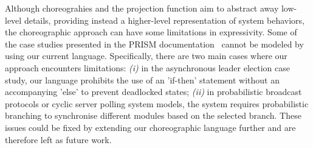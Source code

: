 Although choreograhies and the projection function aim to abstract
away low-level details, providing instead a higher-level
representation of system behaviors,
the choreographic approach can have some limitations in
expressivity. Some of the case studies presented in the PRISM
documentation~\cite{PRISMdoc} cannot be modeled by using our current
language. Specifically, there are two main cases where our approach
encounters limitations:
%
\textit{(i)} in the asynchronous leader election case study, our
language prohibits the use of an 'if-then' statement without an
accompanying 'else' to prevent deadlocked states;
%
\textit{(ii)} in probabilistic broadcast protocols or cyclic server
polling system models, the system requires probabilistic branching to
synchronise different modules based on the selected branch.
%
These issues could be fixed by extending our choreographic language
further and are therefore left as future work.

